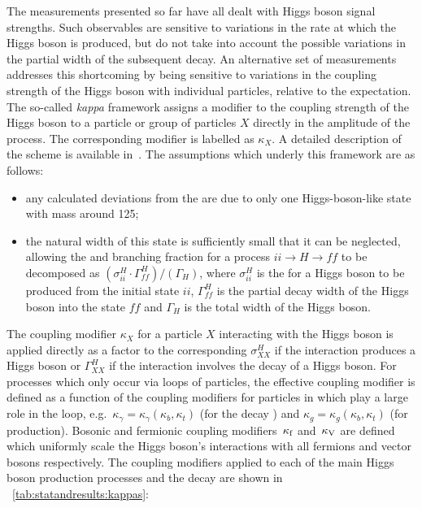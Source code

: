 The measurements presented so far have all dealt with Higgs boson signal strengths. Such observables are sensitive to variations in the rate at which the Higgs boson is produced, but do not take into account the possible variations in the partial width of the subsequent decay. An alternative set of measurements addresses this shortcoming by being sensitive to variations in the coupling strength of the Higgs boson with individual particles, relative to the \SM expectation. The so-called \emph{kappa} framework assigns a modifier to the coupling strength of the Higgs boson to a particle or group of particles $X$ directly in the amplitude of the process. The corresponding modifier is labelled as $\kappa_{X}$. A detailed description of the scheme is available in~\cite{Khachatryan:2016vau}. 
The assumptions which underly this framework are as follows: 
\begin{itemize}
\item any calculated deviations from the \SM are due to only one Higgs-boson-like state with mass around 125\GeV;
\item the natural width of this state is sufficiently small that it can be neglected, allowing the \crosssection and branching fraction for a process $ii\rightarrow H \rightarrow ff$ to be decomposed as $(\sigma_{ii}^{H} \cdot \Gamma_{ff}^{H}) / (\Gamma_H)$, where $\sigma_{ii}^{H}$ is the \crosssection for a Higgs boson to be produced from the initial state $ii$, $\Gamma^{H}_{ff}$ is the partial decay width of the Higgs boson into the state $ff$ and $\Gamma_{H}$ is the total width of the Higgs boson.
\end{itemize}

The coupling modifier $\kappa_{X}$ for a particle $X$ interacting with the Higgs boson is applied directly as a factor to the corresponding $\sigma_{XX}^{H}$ if the interaction produces a Higgs boson or $\Gamma^{H}_{XX}$ if the interaction involves the decay of a Higgs boson. For processes which only occur via loops of particles, the effective coupling modifier is defined as a function of the coupling modifiers for particles in which play a large role in the loop, e.g.~$\kappa_{\gamma} = \kappa_{\gamma}(\kappa_b, \kappa_t) $ (for the decay \Hgg) and $\kappa_{g} = \kappa_{g}(\kappa_b, \kappa_t) $ (for \ggH production).
Bosonic and fermionic coupling modifiers $\,\kappa_\text{f}$ and $\,\kappa_\text{V}$ are defined which uniformly scale the Higgs boson's interactions with all fermions and vector bosons respectively. The coupling modifiers applied to each of the main Higgs boson production processes and the \Hgg decay are shown in \Table~\ref{tab:statandresults:kappas}:

